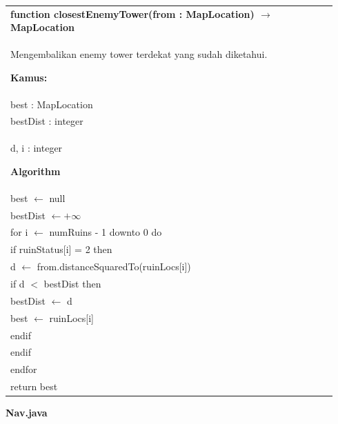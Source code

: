 \documentclass{article}
\newenvironment{pseudobox}
{
\centering
\begin{longtable}{|p{0.94\linewidth}|}
\hline
}
{
\\ \hline
\end{longtable}
\vspace{0.05cm}
}
\begin{document}
\begin{pseudobox}
\textbf{function closestEnemyTower(from : MapLocation) $\rightarrow$ MapLocation} \\
{ Mengembalikan enemy tower terdekat yang sudah diketahui. }

\textbf{Kamus:} \\
\hspace*{1em} best : MapLocation \\
\hspace*{1em} bestDist : integer \\
\hspace*{1em} d, i : integer

\textbf{Algorithm} \\
\hspace*{1em} best $\leftarrow$ null \\
\hspace*{1em} bestDist $\leftarrow +\infty$ \\

\hspace*{1em} for i $\leftarrow$ numRuins - 1 downto 0 do \\
\hspace*{2em} if ruinStatus[i] = 2 then \\
\hspace*{3em} d $\leftarrow$ from.distanceSquaredTo(ruinLocs[i]) \\
\hspace*{3em} if d $<$ bestDist then \\
\hspace*{4em} bestDist $\leftarrow$ d \\
\hspace*{4em} best $\leftarrow$ ruinLocs[i] \\
\hspace*{3em} endif \\
\hspace*{2em} endif \\
\hspace*{1em} endfor \\

\hspace*{1em} return best
\end{pseudobox}



\item \textbf{Nav.java}
\end{document}
